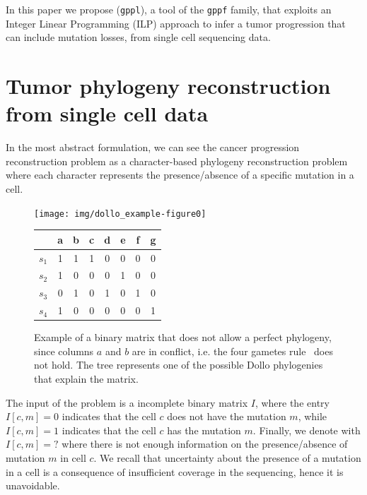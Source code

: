 \documentclass[a4paper,USenglish]{article}
\theoremstyle{definition}
\begin{document}
In this paper we propose (\texttt{gppl}), a tool of the \texttt{gppf} family, that
exploits an Integer Linear Programming (ILP) approach to infer a tumor progression that
can include mutation losses, from
single cell sequencing data.

\section{Tumor phylogeny reconstruction from single cell data}

In the most abstract formulation, we can see the cancer progression reconstruction problem
as a
character-based phylogeny reconstruction problem~\cite{Gusfield} where each character
represents  the presence/absence of a specific mutation in a cell.


\begin{figure}[tb!]
  \begin{minipage}[c]{0.55\textwidth}
     \texttt{[image: img/dollo\_example-figure0]}
\end{minipage}
\begin{minipage}[t]{0.3\textwidth}
        \begin{tabular}[!t]{c|ccccccc}
             & a & b & c & d & e & f & g  \\ \hline
            $s_1$ & 1 & 1 & 1 & 0 & 0 & 0 & 0 \\
            $s_2$ & 1 & 0 & 0 & 0 & 1 & 0 & 0 \\
            $s_3$ & 0 & 1 & 0 & 1 & 0 & 1 & 0 \\
            $s_4$ & 1 & 0 & 0 & 0 & 0 & 0 & 1
        \end{tabular}
        \end{minipage}
  \caption{Example of a binary matrix that does not allow a perfect phylogeny, since columns $a$ and $b$ are in conflict, i.e. the four gametes rule~\cite{gusfield1991}
  does not hold. The tree represents one of the possible Dollo phylogenies that explain the matrix.}
\label{fig:dollo}
\end{figure}

The input of the problem is a incomplete binary matrix $I$, where the entry $I[c,m]=0$ indicates
that the cell $c$ does not have the mutation $m$, while $I[c,m]=1$ indicates that the
cell $c$ has the mutation $m$.
Finally, we denote with $I[c,m]=?$ where there is not enough information on the
presence/absence of mutation $m$ in cell $c$. 
We recall that uncertainty about the presence of a mutation in a cell is a consequence of
insufficient coverage in the sequencing, hence it is unavoidable.
\end{document}
